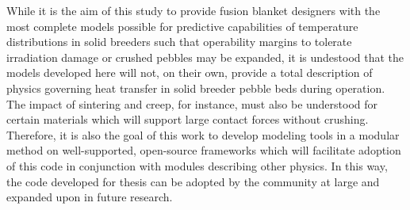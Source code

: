 While it is the aim of this study to provide fusion blanket designers with the most complete models possible for predictive capabilities of temperature distributions in solid breeders such that operability margins to tolerate irradiation damage or crushed pebbles may be expanded, it is undestood that the models developed here will not, on their own, provide a total description of physics governing heat transfer in solid breeder pebble beds during operation. The impact of sintering and creep, for instance, must also be understood for certain materials which will support large contact forces without crushing. Therefore, it is also the goal of this work to develop modeling tools in a modular method on well-supported, open-source frameworks which will facilitate adoption of this code in conjunction with modules describing other physics. In this way, the code developed for thesis can be adopted by the community at large and expanded upon in future research.